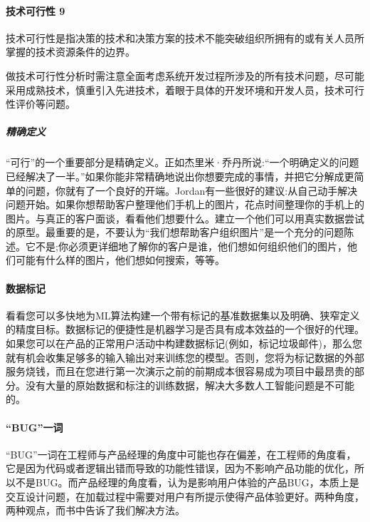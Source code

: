 \documentclass[letterpaper,11pt,english]{sphinxmanual}
\begin{document}
\paragraph{技术可行性 9\sphinxfootnotemark[136]}
\label{\detokenize{chapter_idea/understand_tech:id24}}%
\begin{footnotetext}[136]\sphinxAtStartFootnote
{}
%
\end{footnotetext}\ignorespaces 
技术可行性是指决策的技术和决策方案的技术不能突破组织所拥有的或有关人员所掌握的技术资源条件的边界。

做技术可行性分析时需注意全面考虑系统开发过程所涉及的所有技术问题，尽可能采用成熟技术，慎重引入先进技术，着眼于具体的开发环境和开发人员，技术可行性评价等问题。


\subparagraph{精确定义}
\label{\detokenize{chapter_idea/understand_tech:id25}}
“可行”的一个重要部分是精确定义。正如杰里米·乔丹所说:“一个明确定义的问题已经解决了一半。”如果你能非常精确地说出你想要完成的事情，并把它分解成更简单的问题，你就有了一个良好的开端。Jordan有一些很好的建议:从自己动手解决问题开始。如果你想帮助客户整理他们手机上的图片，花点时间整理你的手机上的图片。与真正的客户面谈，看看他们想要什么。建立一个他们可以用真实数据尝试的原型。最重要的是，不要认为“我们想帮助客户组织图片”是一个充分的问题陈述。它不是;你必须更详细地了解你的客户是谁，他们想如何组织他们的图片，他们可能有什么样的图片，他们想如何搜索，等等。


\paragraph{数据标记}
\label{\detokenize{chapter_idea/understand_tech:id26}}
看看您可以多快地为ML算法构建一个带有标记的基准数据集以及明确、狭窄定义的精度目标。数据标记的便捷性是机器学习是否具有成本效益的一个很好的代理。如果您可以在产品的正常用户活动中构建数据标记(例如，标记垃圾邮件)，那么您就有机会收集足够多的输入\sphinxhyphen{}输出对来训练您的模型。否则，您将为标记数据的外部服务烧钱，而且在您进行第一次演示之前的前期成本很容易成为项目中最昂贵的部分。没有大量的原始数据和标注的训练数据，解决大多数人工智能问题是不可能的。


\paragraph{“BUG”一词}
\label{\detokenize{chapter_idea/understand_tech:bug}}
“BUG”一词在工程师与产品经理的角度中可能也存在偏差，在工程师的角度看，它是因为代码或者逻辑出错而导致的功能性错误，因为不影响产品功能的优化，所以不是BUG。而产品经理的角度看，认为是影响用户体验的产品BUG，本质上是交互设计问题，在加载过程中需要对用户有所提示使得产品体验更好。两种角度，两种观点，而书中告诉了我们解决方法。
\end{document}
